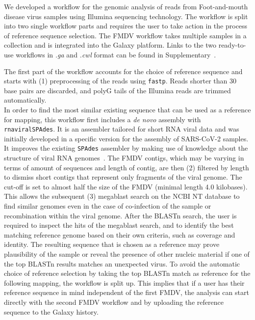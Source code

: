 We developed a workflow for the genomic analysis of reads from Foot-and-mouth disease virus samples using Illumina sequencing technology. The workflow is split into two single workflow parts and requires the user to take action in the process of reference sequence selection. The \ac{FMDV} workflow takes multiple samples in a collection and is integrated into the Galaxy platform. Links to the two ready-to-use workflows in \textit{.ga} and \textit{.cwl} format can be found in Supplementary~. \\


The first part of the workflow accounts for the choice of reference sequence and starts with (1) preprocessing of the reads using \texttt{fastp}. Reads shorter than 30 base pairs are discarded, and polyG tails of the Illumina reads are trimmed automatically. \\
In order to find the most similar existing sequence that can be used as a reference for mapping, this workflow first includes a \textit{de novo} assembly with \texttt{rnaviralSPAdes}. It is an assembler tailored for short \ac{RNA} viral data and was initially developed in a specific version for the assembly of \ac{SARS-CoV-2} samples. It improves the existing \texttt{SPAdes} assembler by making use of knowledge about the structure of viral \ac{RNA} genomes~\cite{meleshko2022coronaspades}. The \ac{FMDV} contigs, which may be varying in terms of amount of sequences and length of contig, are then (2) filtered by length to dismiss short contigs that represent only fragments of the viral genome. The cut-off is set to almost half the size of the \ac{FMDV} (minimal length 4.0 kilobases). This allows the subsequent (3) megablast search on the \ac{NCBI} NT database to find similar genomes even in the case of co-infection of the sample or recombination within the viral genome. After the \ac{BLAST}n search, the user is required to inspect the hits of the megablast search, and to identify the best matching reference genome based on their own criteria, such as coverage and identity. The resulting sequence that is chosen as a reference may prove plausibility of the sample or reveal the presence of other nucleic material if one of the top \ac{BLAST}n results matches an unexpected virus. To avoid the automatic choice of reference selection by taking the top \ac{BLAST}n match as reference for the following mapping, the workflow is split up. This implies that if a user has their reference sequence in mind independent of the first \ac{FMDV}, the analysis can start directly with the second \ac{FMDV} workflow and by uploading the reference sequence to the Galaxy history.

